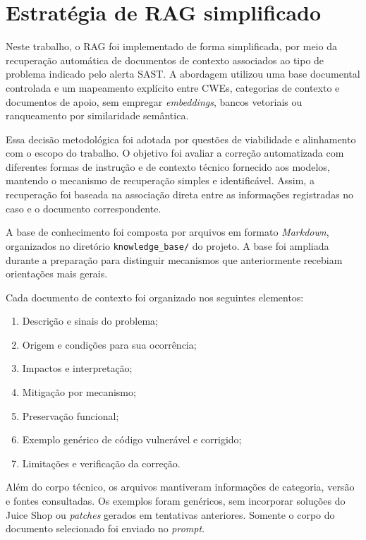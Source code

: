\section{Estratégia de RAG simplificado}
\label{sec:met-rag}

Neste trabalho, o RAG foi implementado de forma simplificada, por meio da recuperação automática de documentos de contexto associados ao tipo de problema indicado pelo alerta SAST. A abordagem utilizou uma base documental controlada e um mapeamento explícito entre CWEs, categorias de contexto e documentos de apoio, sem empregar \textit{embeddings}, bancos vetoriais ou ranqueamento por similaridade semântica.

Essa decisão metodológica foi adotada por questões de viabilidade e alinhamento com o escopo do trabalho. O objetivo foi avaliar a correção automatizada com diferentes formas de instrução e de contexto técnico fornecido aos modelos, mantendo o mecanismo de recuperação simples e identificável. Assim, a recuperação foi baseada na associação direta entre as informações registradas no caso e o documento correspondente.

A base de conhecimento foi composta por arquivos em formato \textit{Markdown}, organizados no diretório \texttt{knowledge\_base/} do projeto. A base foi ampliada durante a preparação para distinguir mecanismos que anteriormente recebiam orientações mais gerais.

Cada documento de contexto foi organizado nos seguintes elementos:

\begin{enumerate}
    \item Descrição e sinais do problema;
    \item Origem e condições para sua ocorrência;
    \item Impactos e interpretação;
    \item Mitigação por mecanismo;
    \item Preservação funcional;
    \item Exemplo genérico de código vulnerável e corrigido;
    \item Limitações e verificação da correção.
\end{enumerate}

Além do corpo técnico, os arquivos mantiveram informações de categoria, versão e fontes consultadas. Os exemplos foram genéricos, sem incorporar soluções do Juice Shop ou \textit{patches} gerados em tentativas anteriores. Somente o corpo do documento selecionado foi enviado no \textit{prompt}.

